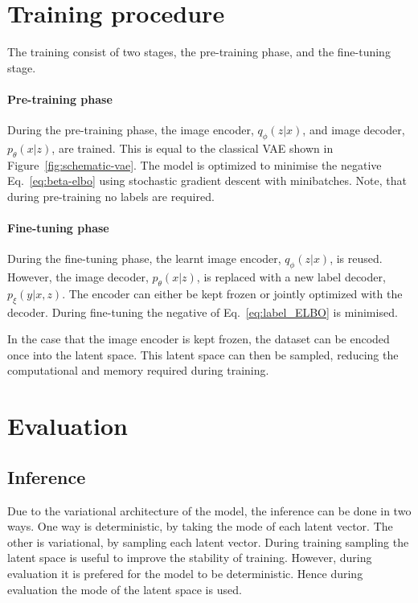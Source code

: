 \section{Training procedure}
The training consist of two stages, the pre-training phase, and the fine-tuning stage. 
\paragraph*{Pre-training phase} During the pre-training phase, the image encoder, $q_\phi(z|x)$, and image decoder, $p_\theta(x|z)$, are trained. This is equal to the classical VAE shown in Figure~\ref{fig:schematic-vae}. The model is optimized to minimise the negative Eq.~\ref{eq:beta-elbo} using stochastic gradient descent with minibatches. Note, that during pre-training no labels are required.

\paragraph*{Fine-tuning phase} During the fine-tuning phase, the learnt image encoder, $q_\phi(z|x)$, is reused. However, the image decoder, $p_\theta(x|z)$, is replaced with a new label decoder, $p_\xi(y|x,z)$. The encoder can either be kept frozen or jointly optimized with the decoder. During fine-tuning the negative of Eq.~\ref{eq:label_ELBO} is minimised.

In the case that the image encoder is kept frozen, the dataset can be encoded once into the latent space. This latent space can then be sampled, reducing the computational and memory required during training.

\section{Evaluation}
\subsection{Inference}
Due to the variational architecture of the model, the inference can be done in two ways. One way is deterministic, by taking the mode of each latent vector. The other is variational, by sampling each latent vector. During training sampling the latent space is useful to improve the stability of training. However, during evaluation it is prefered for the model to be deterministic. Hence during evaluation the mode of the latent space is used.

